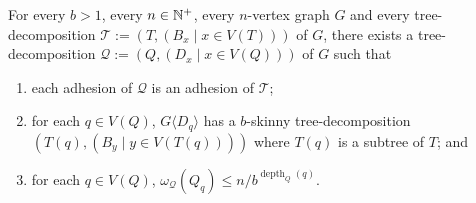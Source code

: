 \documentclass{patmorin}
\renewcommand{\le}{\leqslant}
\newcommand{\piotr}[1]{\textcolor{red}{PiMi: #1}}
\newcommand{\torso}[2]{{#1}\langle{#2}\rangle}
\DeclareMathOperator{\depth}{depth}
\newcommand{\calQ}{\mathcal{Q}}
\newcommand{\calT}{\mathcal{T}}
\begin{document}
  \begin{cor}\label{b_skinny_decomp}
    For every $b>1$, every $n\in\mathbb{N}^+$, every $n$-vertex graph $G$ and every tree-decomposition $\calT:=(T,(B_x\mid x\in V(T)))$ of $G$, there exists a tree-decomposition $\calQ:=(Q,(D_x\mid x\in V(Q)))$ of $G$ such that
    \begin{enumerate}[nosep,nolistsep,label=(\alph*)]
      \item\label{prop_adhesion} 
      each adhesion of $\calQ$ is an adhesion of $\calT$;
      \item\label{prop_skinny_torso} for each $q\in V(Q)$, $\torso{G}{D_q}$ has a $b$-skinny tree-decomposition $(T(q), (B_y\mid y\in V(T(q))))$ where $T(q)$ is a subtree of $T$; and
      \item\label{prop_geometric} for each $q\in V(Q)$, $\omega_\calQ(Q_{q})\le n/b^{\depth_{Q}(q)}$.
    \end{enumerate}
  \end{cor}
\end{document}
